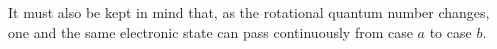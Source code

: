 It must also be kept in mind that, as the rotational quantum number changes, one and the same electronic state can pass continuously from case $a$ to case $b$.
